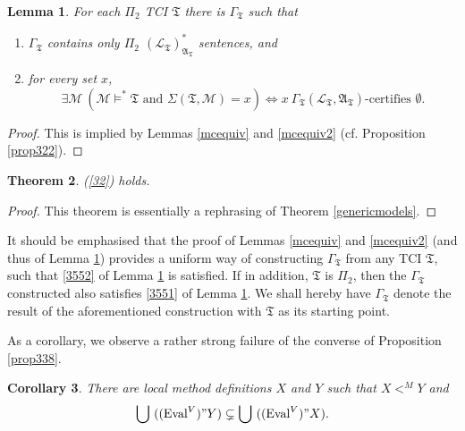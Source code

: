 \documentclass[12pt, twoside]{memoir}
\numberwithin{equation}{section}
\newtheorem{thm}{Theorem}[section]
\newtheorem{lem}[thm]{Lemma}
\newtheorem{cor}[thm]{Corollary}
\theoremstyle{definition}
\theoremstyle{remark}
\theoremstyle{definition}
\theoremstyle{definition}
\theoremstyle{definition}
\theoremstyle{remark}
\begin{document}
\begin{lem}\label{lem350}
For each $\Pi_2$ TCI $\mathfrak{T}$ there is $\Gamma_{\mathfrak{T}}$ such that
\begin{enumerate}[label=(\arabic*)]
    \item\label{3551} $\Gamma_{\mathfrak{T}}$ contains only $\Pi_2$ $(\mathcal{L}_{\mathfrak{T}})^*_{\mathfrak{A}_{\mathfrak{T}}}$ sentences, and
    \item\label{3552} for every set $x$,
    \begin{equation*}
        \exists \mathcal{M} \ (\mathcal{M} \models^* \mathfrak{T} \text{ and } \Sigma(\mathfrak{T}, \mathcal{M}) = x) \iff x \ \Gamma_{\mathfrak{T}} (\mathcal{L}_{\mathfrak{T}}, \mathfrak{A}_{\mathfrak{T}})\text{-certifies } \emptyset \text{.}
    \end{equation*}
\end{enumerate}
\end{lem}

\begin{proof}
This is implied by Lemmas \ref{mcequiv} and \ref{mcequiv2} (cf. Proposition \ref{prop322}).
\end{proof}

\begin{thm}\label{thm351}
(\ref{32}) holds.
\end{thm}

\begin{proof}
This theorem is essentially a rephrasing of Theorem \ref{genericmodels}.
\end{proof}

It should be emphasised that the proof of Lemmas \ref{mcequiv} and \ref{mcequiv2} (and thus of Lemma \ref{lem350}) provides a uniform way of constructing $\Gamma_{\mathfrak{T}}$ from any TCI $\mathfrak{T}$, such that \ref{3552} of Lemma \ref{lem350} is satisfied. If in addition, $\mathfrak{T}$ is $\Pi_2$, then the $\Gamma_{\mathfrak{T}}$ constructed also satisfies \ref{3551} of Lemma \ref{lem350}. We shall hereby have $\Gamma_{\mathfrak{T}}$ denote the result of the aforementioned construction with $\mathfrak{T}$ as its starting point.

As a corollary, we observe a rather strong failure of the converse of Proposition \ref{prop338}.

\begin{cor}\label{cor356}
There are local method definitions $X$ and $Y$ such that $X <^M Y$ and 
\begin{equation*}
    \bigcup \ ((\mathrm{Eval}^V)" Y)  \subsetneq \bigcup \ ((\mathrm{Eval}^V)" X) \text{.}
\end{equation*}
\end{cor}
\end{document}
